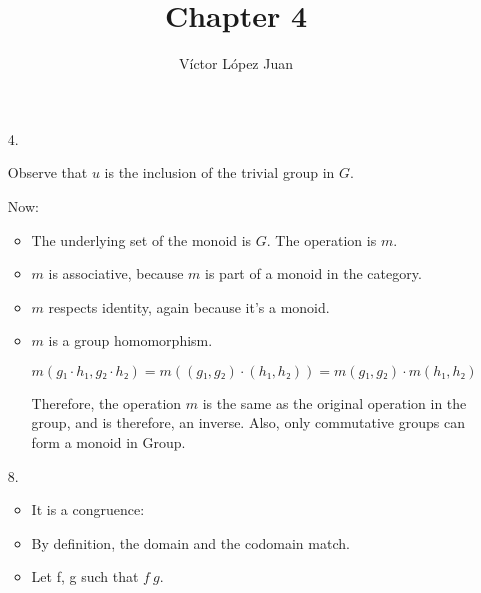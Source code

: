 \documentclass{article}
\author{Víctor López Juan}
\title{Chapter 4}
\begin{document}
\begin{enumerate}
  \item[4.]




    Observe that $u$ is the inclusion of the trivial group in $G$.

    Now:

    \begin{itemize}
      \item The underlying set of the monoid is $G$. The operation is $m$.
      \item $m$ is associative, because $m$ is part of a monoid in the
        category.

      \item $m$ respects identity, again because it's a monoid.

      \item $m$ is a group homomorphism.

        $m(g₁·h₁, g₂·h₂) = m((g₁,g₂)·(h₁,h₂)) = m(g₁,g₂)·m(h₁,h₂)$
                                              

        Therefore, the operation $m$ is the same as the original operation
        in the group, and is therefore, an inverse. Also, only commutative
        groups can form a monoid in Group.
    \end{itemize}
        

  \item[8.]

    \begin{itemize}
      \item It is a congruence:


        \item By definition, the domain and the codomain match.
        \item
          Let f, g such that $f ~ g$.
          


\end{itemize}
\end{enumerate}
\end{document}
